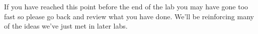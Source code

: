 If you have reached this point before the end of the lab you may have gone too fast so please go back and review what you have done. We'll be reinforcing many of the ideas we've just met in later labs.






